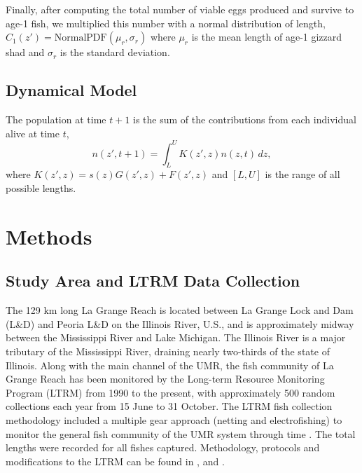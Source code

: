 \documentclass[preprint,review,12pt,authoryear]{elsarticle}
\def\ds{\displaystyle}
\begin{document}
Finally, after computing the total number of viable eggs produced and survive to age-1 fish, we multiplied this number with a normal distribution of length,
$ \ds C_1 (z') =  \mathrm{Normal PDF} (\mu_r, \sigma_r)$ where $\mu_r$ is the mean length of age-1 gizzard shad and $\sigma_r$ is the standard deviation. 

\subsection{Dynamical Model} 
The population at time $t+1$ is the sum of the contributions from each individual alive at time $t$,
\begin{equation}\label{eq:IPM}
n(z',t+1) = \int_L^U K(z',z)n(z,t) \,dz,
\end{equation}  
where $K(z',z) = s(z) G(z',z) + F(z',z)$ and $[L,U]$ is the range of all possible lengths.

\section{Methods}
\subsection{Study Area and LTRM Data Collection}
The 129 km long La Grange Reach is located between La Grange Lock and Dam (L\&D) and Peoria L\&D on the Illinois River, U.S., and is approximately midway between the Mississippi River and Lake Michigan. 
The Illinois River is a major tributary of the Mississippi River, draining nearly two-thirds of the state of Illinois. 
Along with the main channel of the UMR, the fish community of La Grange Reach has been monitored by the Long-term Resource Monitoring Program (LTRM) from 1990 to the present, with approximately 500 random collections each year from 15 June to 31 October. 
The LTRM fish collection methodology included a multiple gear approach (netting and electrofishing) to monitor the general fish community of the UMR system through time \citep{gutreuter1995long}. 
The total lengths were recorded for all fishes captured. 
Methodology, protocols and modifications to the LTRM can be found in \cite{gutreuter1995long}, and \cite{ickes2002evaluation}. 
\end{document}

